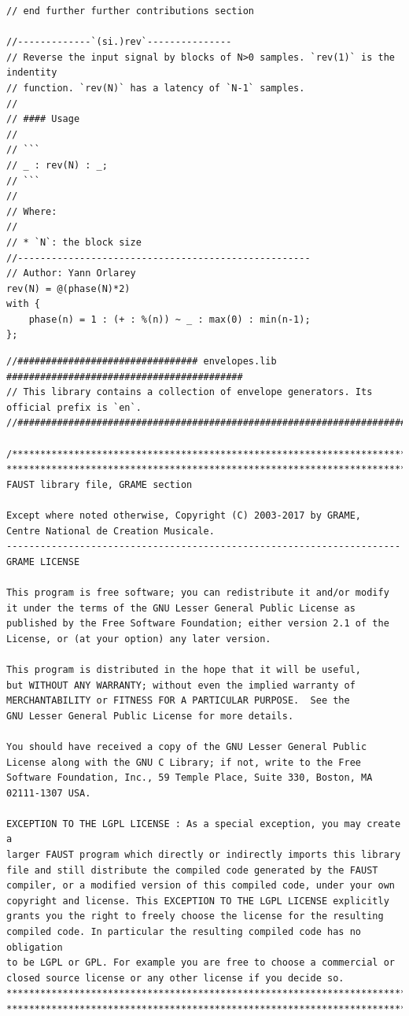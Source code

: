 \documentclass{article}
\begin{document}
\begin{lstlisting}[caption=\texttt{signals.lib}]
// end further further contributions section

//-------------`(si.)rev`---------------
// Reverse the input signal by blocks of N>0 samples. `rev(1)` is the indentity
// function. `rev(N)` has a latency of `N-1` samples.
//
// #### Usage
//
// ```
// _ : rev(N) : _;
// ```
//
// Where:
//
// * `N`: the block size
//----------------------------------------------------
// Author: Yann Orlarey
rev(N) = @(phase(N)*2) 
with {
	phase(n) = 1 : (+ : %(n)) ~ _ : max(0) : min(n-1);
};
\end{lstlisting}


\bigskip\bigskip
\begin{lstlisting}[caption=\texttt{envelopes.lib}]
//################################ envelopes.lib ##########################################
// This library contains a collection of envelope generators. Its official prefix is `en`.
//########################################################################################

/************************************************************************
************************************************************************
FAUST library file, GRAME section

Except where noted otherwise, Copyright (C) 2003-2017 by GRAME,
Centre National de Creation Musicale.
----------------------------------------------------------------------
GRAME LICENSE

This program is free software; you can redistribute it and/or modify
it under the terms of the GNU Lesser General Public License as
published by the Free Software Foundation; either version 2.1 of the
License, or (at your option) any later version.

This program is distributed in the hope that it will be useful,
but WITHOUT ANY WARRANTY; without even the implied warranty of
MERCHANTABILITY or FITNESS FOR A PARTICULAR PURPOSE.  See the
GNU Lesser General Public License for more details.

You should have received a copy of the GNU Lesser General Public
License along with the GNU C Library; if not, write to the Free
Software Foundation, Inc., 59 Temple Place, Suite 330, Boston, MA
02111-1307 USA.

EXCEPTION TO THE LGPL LICENSE : As a special exception, you may create a
larger FAUST program which directly or indirectly imports this library
file and still distribute the compiled code generated by the FAUST
compiler, or a modified version of this compiled code, under your own
copyright and license. This EXCEPTION TO THE LGPL LICENSE explicitly
grants you the right to freely choose the license for the resulting
compiled code. In particular the resulting compiled code has no obligation
to be LGPL or GPL. For example you are free to choose a commercial or
closed source license or any other license if you decide so.
************************************************************************
************************************************************************/


\end{lstlisting}
\end{document}
